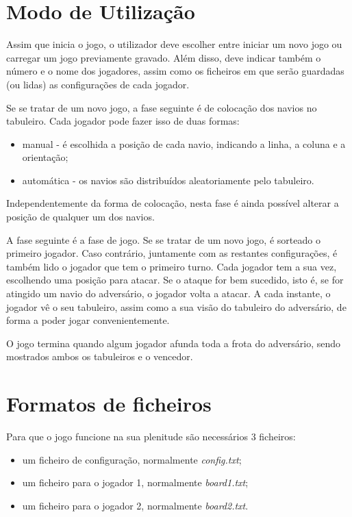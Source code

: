 \documentclass[12pt,a4paper,reqno]{report}
\numberwithin{equation}{section}
\begin{document}
\section{Modo de Utilização}
	
	Assim que inicia o jogo, o utilizador deve escolher entre iniciar um novo jogo ou carregar um jogo previamente gravado. Além disso, deve indicar também o número e o nome dos jogadores, assim como os ficheiros em que serão guardadas (ou lidas) as configurações de cada jogador.
	
	Se se tratar de um novo jogo, a fase seguinte é de colocação dos navios no tabuleiro. Cada jogador pode fazer isso de duas formas:
	\begin{itemize}
		\item manual - é escolhida a posição de cada navio, indicando a linha, a coluna e a orientação;
		\item automática - os navios são distribuídos aleatoriamente pelo tabuleiro.
	\end{itemize}
	Independentemente da forma de colocação, nesta fase é ainda possível alterar a posição de qualquer um dos navios.
	
	A fase seguinte é a fase de jogo. Se se tratar de um novo jogo, é sorteado o primeiro jogador. Caso contrário, juntamente com as restantes configurações, é também lido o jogador que tem o primeiro turno. Cada jogador tem a sua vez, escolhendo uma posição para atacar. Se o ataque for bem sucedido, isto é, se for atingido um navio do adversário, o jogador volta a atacar. A cada instante, o jogador vê o seu tabuleiro, assim como a sua visão do tabuleiro do adversário, de forma a poder jogar convenientemente.
	
	O jogo termina quando algum jogador afunda toda a frota do adversário, sendo mostrados ambos os tabuleiros e o vencedor.

\section{Formatos de ficheiros}

	Para que o jogo funcione na sua plenitude são necessários 3 ficheiros:
	\begin{itemize}
		\item um ficheiro de configuração, normalmente \emph{config.txt};
		\item um ficheiro para o jogador 1, normalmente \emph{board1.txt};
		\item um ficheiro para o jogador 2, normalmente \emph{board2.txt}.
	\end{itemize}
	
\end{document}
